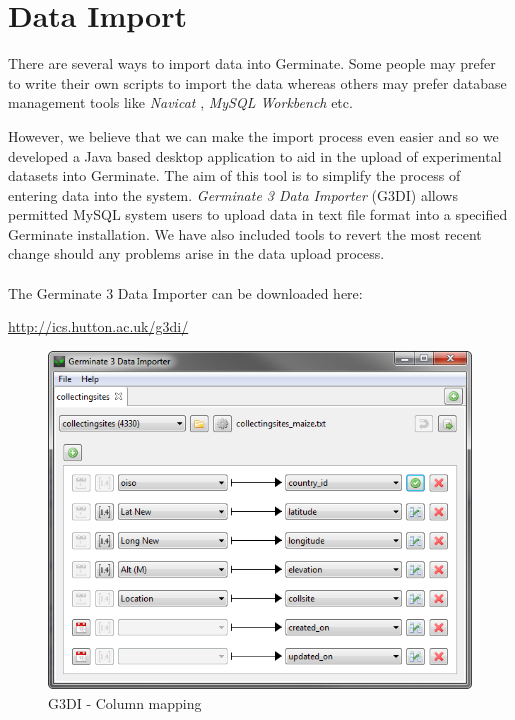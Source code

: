\section{Data Import}
\label{sec:dataimport}
There are several ways to import data into Germinate. Some people may prefer to write their own scripts to import the data whereas others may prefer database management tools like \textit{Navicat} \cite{Navicat}, \textit{MySQL Workbench} \cite{MySQLWorkbench} etc.

However, we believe that we can make the import process even easier and so we developed a Java based desktop application to aid in the upload of experimental datasets into Germinate. The aim of this tool is to simplify the process of entering data into the system. \textit{Germinate 3 Data Importer} (G3DI) allows permitted MySQL system users to upload data in text file format into a specified Germinate installation. We have also included tools to revert the most recent change should any problems arise in the data upload process.\\
\\
The Germinate 3 Data Importer can be downloaded here:

\begin{center}
    \url{http://ics.hutton.ac.uk/g3di/}
\end{center}

\begin{figure}
    \centering
    \includegraphics[scale=0.6]{img/import/g3di-mapping.png}
    \caption{G3DI - Column mapping}
    \label{fig:g3di-mapping}
\end{figure}

